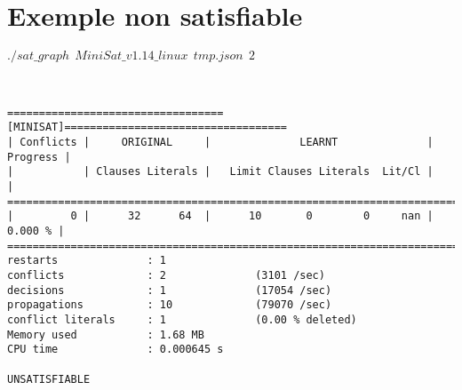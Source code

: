 \documentclass[french, 12pt]{report}
\newcommand{\formula}[1]{
\begin{center}
{#1}
\end{center}
}
\begin{document}
\section{Exemple non satisfiable}

\formula{$./sat\_graph\ \ MiniSat\_v1.14\_linux\ \ tmp.json\ \ 2$}
\ \\
\begin{lstlisting}
==================================[MINISAT]===================================
| Conflicts |     ORIGINAL     |              LEARNT              | Progress |
|           | Clauses Literals |   Limit Clauses Literals  Lit/Cl |          |
==============================================================================
|         0 |      32      64  |      10       0        0     nan |  0.000 % |
==============================================================================
restarts              : 1
conflicts             : 2              (3101 /sec)
decisions             : 1              (17054 /sec)
propagations          : 10             (79070 /sec)
conflict literals     : 1              (0.00 % deleted)
Memory used           : 1.68 MB
CPU time              : 0.000645 s

UNSATISFIABLE


\end{lstlisting}
\end{document}
